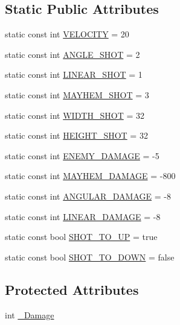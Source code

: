 \subsection*{Static Public Attributes}
\begin{DoxyCompactItemize}
\item 
static const int \hyperlink{class_shot_af9fdec8f5ede1faa442fac378a81b072}{V\-E\-L\-O\-C\-I\-T\-Y} = 20
\item 
static const int \hyperlink{class_shot_a26d13b7f383ca64bb6e775b8dbaba834}{A\-N\-G\-L\-E\-\_\-\-S\-H\-O\-T} = 2
\item 
static const int \hyperlink{class_shot_a5b86e410ce75a9e9c5277e6a3a6ebbf7}{L\-I\-N\-E\-A\-R\-\_\-\-S\-H\-O\-T} = 1
\item 
static const int \hyperlink{class_shot_aea2978e9d7f2212f66d33b44fa864e7c}{M\-A\-Y\-H\-E\-M\-\_\-\-S\-H\-O\-T} = 3
\item 
static const int \hyperlink{class_shot_a8b4df95b379ba5fbecc41612c086f429}{W\-I\-D\-T\-H\-\_\-\-S\-H\-O\-T} = 32
\item 
static const int \hyperlink{class_shot_a1f4c11429e906bd99576ed89dcc1c487}{H\-E\-I\-G\-H\-T\-\_\-\-S\-H\-O\-T} = 32
\item 
static const int \hyperlink{class_shot_a1f093fa878e873dd07133df7217c0298}{E\-N\-E\-M\-Y\-\_\-\-D\-A\-M\-A\-G\-E} = -\/5
\item 
static const int \hyperlink{class_shot_a2c364fcd4dec0d1e0f4b2df259df80c5}{M\-A\-Y\-H\-E\-M\-\_\-\-D\-A\-M\-A\-G\-E} = -\/800
\item 
static const int \hyperlink{class_shot_a795b718149dd6d1ab4162103bd0a31c9}{A\-N\-G\-U\-L\-A\-R\-\_\-\-D\-A\-M\-A\-G\-E} = -\/8
\item 
static const int \hyperlink{class_shot_a678ee4d5bb816dc0e0ece5f88e887ec3}{L\-I\-N\-E\-A\-R\-\_\-\-D\-A\-M\-A\-G\-E} = -\/8
\item 
static const bool \hyperlink{class_shot_a578cf779712b5b7752c3d900c062f49c}{S\-H\-O\-T\-\_\-\-T\-O\-\_\-\-U\-P} = true
\item 
static const bool \hyperlink{class_shot_a1e552f6e2ad653bf2b1313f870566a17}{S\-H\-O\-T\-\_\-\-T\-O\-\_\-\-D\-O\-W\-N} = false
\end{DoxyCompactItemize}
\subsection*{Protected Attributes}
\begin{DoxyCompactItemize}
\item 
int \hyperlink{class_shot_a1aa9cf447026ba338930899bebde1d4b}{\-\_\-\-Damage}
\end{DoxyCompactItemize}
